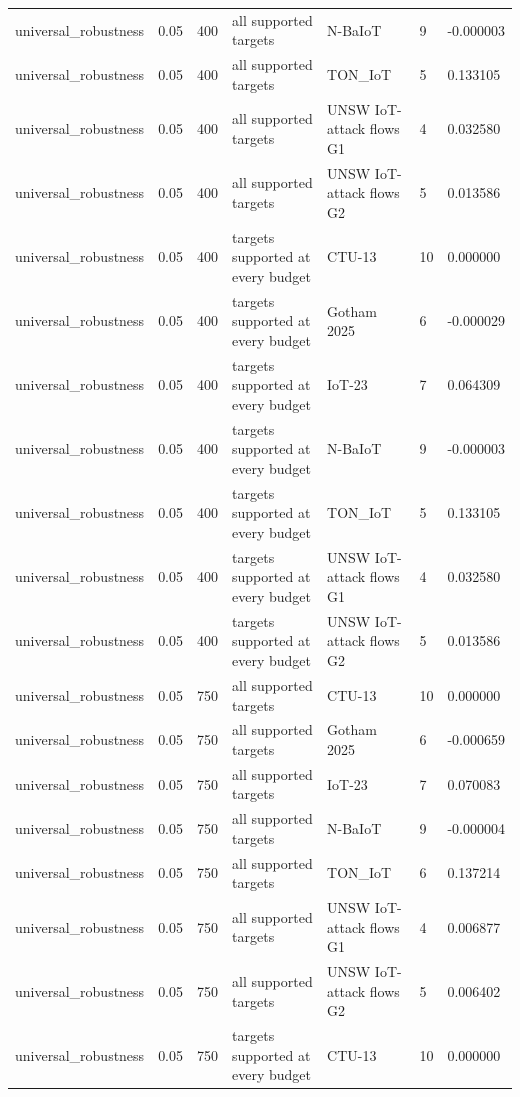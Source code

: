 \begin{tabular}{lllllll}
universal\_robustness & 0.05 & 400 & all supported targets & N-BaIoT & 9 & -0.000003 \\
universal\_robustness & 0.05 & 400 & all supported targets & TON\_IoT & 5 & 0.133105 \\
universal\_robustness & 0.05 & 400 & all supported targets & UNSW IoT-attack flows G1 & 4 & 0.032580 \\
universal\_robustness & 0.05 & 400 & all supported targets & UNSW IoT-attack flows G2 & 5 & 0.013586 \\
universal\_robustness & 0.05 & 400 & targets supported at every budget & CTU-13 & 10 & 0.000000 \\
universal\_robustness & 0.05 & 400 & targets supported at every budget & Gotham 2025 & 6 & -0.000029 \\
universal\_robustness & 0.05 & 400 & targets supported at every budget & IoT-23 & 7 & 0.064309 \\
universal\_robustness & 0.05 & 400 & targets supported at every budget & N-BaIoT & 9 & -0.000003 \\
universal\_robustness & 0.05 & 400 & targets supported at every budget & TON\_IoT & 5 & 0.133105 \\
universal\_robustness & 0.05 & 400 & targets supported at every budget & UNSW IoT-attack flows G1 & 4 & 0.032580 \\
universal\_robustness & 0.05 & 400 & targets supported at every budget & UNSW IoT-attack flows G2 & 5 & 0.013586 \\
universal\_robustness & 0.05 & 750 & all supported targets & CTU-13 & 10 & 0.000000 \\
universal\_robustness & 0.05 & 750 & all supported targets & Gotham 2025 & 6 & -0.000659 \\
universal\_robustness & 0.05 & 750 & all supported targets & IoT-23 & 7 & 0.070083 \\
universal\_robustness & 0.05 & 750 & all supported targets & N-BaIoT & 9 & -0.000004 \\
universal\_robustness & 0.05 & 750 & all supported targets & TON\_IoT & 6 & 0.137214 \\
universal\_robustness & 0.05 & 750 & all supported targets & UNSW IoT-attack flows G1 & 4 & 0.006877 \\
universal\_robustness & 0.05 & 750 & all supported targets & UNSW IoT-attack flows G2 & 5 & 0.006402 \\
universal\_robustness & 0.05 & 750 & targets supported at every budget & CTU-13 & 10 & 0.000000 \\

\end{tabular}
